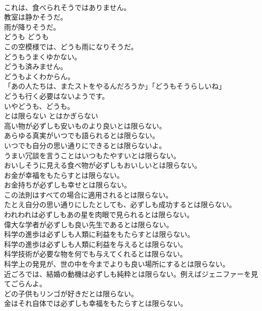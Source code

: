 \documentclass[8pt]{extreport}
\begin{document}
\begin{CJK}{UTF8}{min}
\\	これは、食べられそうではありません。  
\\	教室は静かそうだ。   
\\	雨が降りそうだ。  
\\	どうも	どうも	
\\	この空模様では、どうも雨になりそうだ。  
\\	どうもうまくゆかない。  
\\	どうも済みません。  
\\	どうもよくわからん。  
\\	「あの人たちは、またストをやるんだろうか」「どうもそうらしいね」  
\\	どうも行く必要はないようです。  
\\	いやどうも、どうも。  
\\	とは限らない	とはかぎらない	
\\	高い物が必ずしも安いものより良いとは限らない。  
\\	あらゆる真実がいつでも語られるとは限らない。  
\\	いつでも自分の思い通りにできるとは限らないよ。   
\\	うまい冗談を言うことはいつもたやすいとは限らない。   
\\	おいしそうに見える食べ物が必ずしもおいしいとは限らない。  
\\	お金が幸福をもたらすとは限らない。   
\\	お金持ちが必ずしも幸せとは限らない。   
\\	この法則はすべての場合に適用されるとは限らない。   
\\	たとえ自分の思い通りにしたとしても、必ずしも成功するとは限らない。   
\\	われわれは必ずしもあの星を肉眼で見られるとは限らない。   
\\	偉大な学者が必ずしも良い先生であるとは限らない。   
\\	科学の進歩は必ずしも人類に利益をもたらすとは限らない。   
\\	科学の進歩は必ずしも人類に利益を与えるとは限らない。   
\\	科学技術が必要な物を何でも与えてくれるとは限らない。   
\\	科学上の発見が、世の中を今までよりも良い場所にするとは限らない。   
\\	近ごろでは、結婚の動機は必ずしも純粋とは限らない。例えばジェニファーを見てごらんよ。   
\\	どの子供もリンゴが好きだとは限らない。   
\\	金はそれ自体では必ずしも幸福をもたらすとは限らない。   

\end{CJK}
\end{document}
